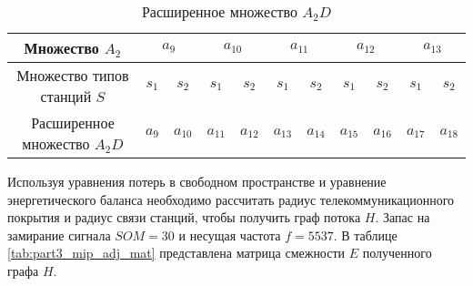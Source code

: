 \begin{table}[h]
    \begin{tabular}{|  c||  c|  c|  c|  c|  c|  c|  c|  c|  c|  c|}
    

    \hline
    \tiny
    Множество $A_2$&\multicolumn{2}{c|}{$a_9$}&\multicolumn{2}{c|}{$a_{10}$}&\multicolumn{2}{c|}{$a_{11}$}& \multicolumn{2}{c|}{$a_{12}$}&\multicolumn{2}{c|}{$a_{13}$} \\
    \hline
    Множество типов станций $S$&$s_1$& $s_2$&$s_1$& $s_2$& $s_1$& $s_2$& $s_1$& $s_2$& $s_1$& $s_2$  \\
    \hline
    Расширенное множество $A_2D$&$a_9$& $a_{10}$&$a_{11}$&$a_{12}$& $a_{13}$& $a_{14}$& $a_{15}$& $a_{16}$& $a_{17}$& $a_{18}$  \\
  
    \hline
    \end{tabular}
    \caption{Расширенное множество $A_2D$}\label{tab:part3_mip_station_point}
\end{table}
\normalsize

Используя уравнения потерь в свободном пространстве и уравнение энергетического баланса необходимо рассчитать радиус телекоммуникационного покрытия и радиус связи станций, чтобы получить граф потока $H$. Запас на замирание сигнала $SOM = 30$ и несущая частота $f=5537$. В таблице \cref{tab:part3_mip_adj_mat} представлена матрица смежности $E$ полученного графа $H$.


